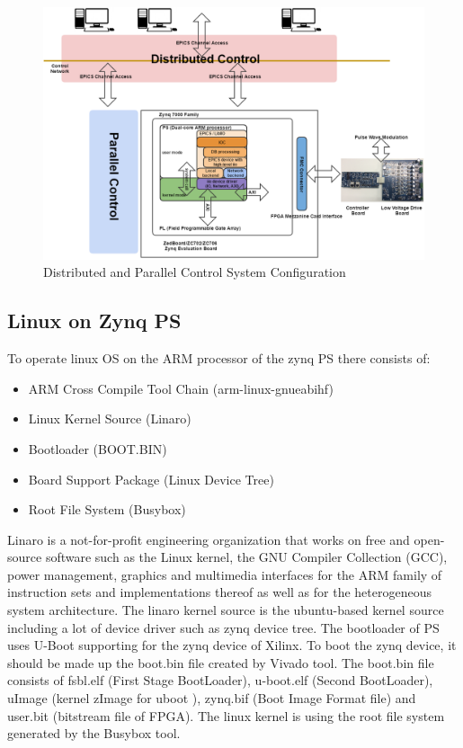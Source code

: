 \documentclass[journal]{IEEEtran}
\begin{document}
\begin{figure}[!tbh]
	\centering
	\includegraphics*[width=\textwidth,height=0.6\textwidth]{img01.png}
	\caption{Distributed and Parallel Control System Configuration}
	\label{control_system}
\end{figure}

\subsection{Linux on Zynq PS}
To operate linux OS on the ARM processor of the zynq PS there consists of:
\begin{itemize}
	\item ARM Cross Compile Tool Chain (arm-linux-gnueabihf)
	\item Linux Kernel Source (Linaro)
	\item Bootloader (BOOT.BIN)
	\item Board Support Package (Linux Device Tree)
	\item Root File System (Busybox)
\end{itemize}

Linaro\cite{linaro} is a not-for-profit engineering organization that works on free and open-source software such as the Linux kernel, the GNU Compiler Collection (GCC), power management, graphics and multimedia interfaces for the ARM family of instruction sets and implementations thereof as well as for the heterogeneous system architecture. The linaro kernel source is the ubuntu-based kernel source including a lot of device driver such as zynq device tree. 
The bootloader of PS uses U-Boot\cite{u-boot} supporting for the zynq device of Xilinx. To boot the zynq device, it should be made up the boot.bin file created by Vivado\cite{vivado} tool. The boot.bin\cite{boot-bin} file consists of fsbl.elf (First Stage BootLoader), u-boot.elf (Second BootLoader), uImage (kernel zImage for uboot ), zynq.bif (Boot Image Format file) and user.bit (bitstream file of FPGA). The linux kernel is using the root file system generated by the Busybox\cite{busybox} tool.
\end{document}
